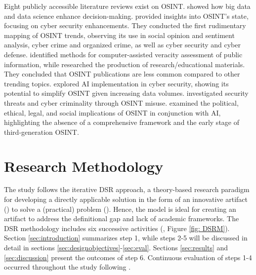 \documentclass[10pt]{article}
\begin{document}
Eight publicly accessible literature reviews exist on OSINT. \textcite{DosPassos.2017} showed how big data and data science enhance decision-making. \textcite{PastorGalindo.2019, PastorGalindo.2020}
provided insights into OSINT's state, focusing on cyber security
enhancements. They conducted the first rudimentary mapping of OSINT trends, observing its use in social opinion and sentiment
analysis, cyber crime and organized crime, as well as cyber security and cyber defense. \textcite{GarciaLozano.2020} identified methods for computer-assisted veracity assessment of public information, while
\textcite{HerreraCubides.2020} researched the production of research/educational materials. They concluded that OSINT
publications are less common compared to other trending topics. \textcite{Yogish.2021} explored AI  implementation in cyber security, showing its potential to simplify OSINT given increasing data volumes.
\textcite{Hwang.2022} investigated security threats and cyber criminality through OSINT misuse.
\textcite{Ghioni.2023} examined the political, ethical, legal, and social implications of
OSINT in conjunction with AI, highlighting the absence of a comprehensive framework and the early stage of third-generation OSINT.

\section{Research Methodology}

The study follows the iterative DSR approach, a theory-based research paradigm for developing a directly applicable solution in the form of an innovative artifact (\cite{vomBrocke.2020b})
to solve a (practical) problem (\cite{Peffers.2007}). Hence, the model is ideal for creating an artifact to address the definitional gap and lack of academic frameworks. %
The DSR methodology includes six successive activities (\cite{Peffers.2007}, Figure \ref{fig: DSRM}). Section \ref{sec:introduction} summarizes step 1, while steps 2-5 will be discussed in detail in sections \ref{sec:designobjectives}-\ref{sec:eval}. Sections \ref{sec:results} and \ref{sec:discussion} present the outcomes of step 6. Continuous evaluation of steps 1-4 occurred throughout the study following \textcite{Sonnenberg.2012}.
\end{document}
